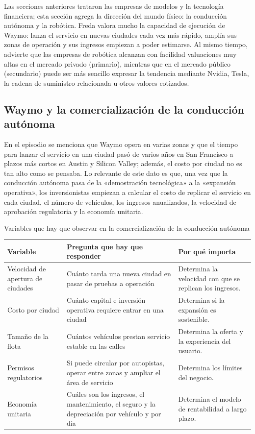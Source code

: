 \documentclass[a4paper]{article}
\begin{document}
Las secciones anteriores trataron las empresas de modelos y la tecnología financiera; esta sección agrega la dirección del mundo físico: la conducción autónoma y la robótica. Freda valora mucho la capacidad de ejecución de Waymo: lanza el servicio en nuevas ciudades cada vez más rápido, amplía sus zonas de operación y sus ingresos empiezan a poder estimarse. Al mismo tiempo, advierte que las empresas de robótica alcanzan con facilidad valuaciones muy altas en el mercado privado (primario), mientras que en el mercado público (secundario) puede ser más sencillo expresar la tendencia mediante Nvidia, Tesla, la cadena de suministro relacionada u otros valores cotizados.

\subsection{Waymo y la comercialización de la conducción autónoma}

En el episodio se menciona que Waymo opera en varias zonas y que el tiempo para lanzar el servicio en una ciudad pasó de varios años en San Francisco a plazos más cortos en Austin y Silicon Valley; además, el costo por ciudad no es tan alto como se pensaba. Lo relevante de este dato es que, una vez que la conducción autónoma pasa de la «demostración tecnológica» a la «expansión operativa», los inversionistas empiezan a calcular el costo de replicar el servicio en cada ciudad, el número de vehículos, los ingresos anualizados, la velocidad de aprobación regulatoria y la economía unitaria.

\begin{knowledgebox}{Variables que hay que observar en la comercialización de la conducción autónoma}
\begin{tabularx}{\textwidth}{p{}p{}X}
\toprule
Variable & Pregunta que hay que responder & Por qué importa \\
\midrule
Velocidad de apertura de ciudades & Cuánto tarda una nueva ciudad en pasar de pruebas a operación & Determina la velocidad con que se replican los ingresos. \\
Costo por ciudad & Cuánto capital e inversión operativa requiere entrar en una ciudad & Determina si la expansión es sostenible. \\
Tamaño de la flota & Cuántos vehículos prestan servicio estable en las calles & Determina la oferta y la experiencia del usuario. \\
Permisos regulatorios & Si puede circular por autopistas, operar entre zonas y ampliar el área de servicio & Determina los límites del negocio. \\
Economía unitaria & Cuáles son los ingresos, el mantenimiento, el seguro y la depreciación por vehículo y por día & Determina el modelo de rentabilidad a largo plazo. \\
\bottomrule
\end{tabularx}
\end{knowledgebox}
\end{document}
